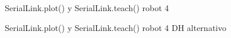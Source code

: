 \documentclass[a4paper,12pt]{article}
\begin{document}
\begin{figure}[htpb]
    \centering
    \begin{adjustbox}{max width=\columnwidth}
    \end{adjustbox}
    \caption{SerialLink.plot() y SerialLink.teach() robot 4}
    \label{teach robot 4}
\end{figure}

\begin{figure}[htpb]
    \centering
    \begin{adjustbox}{max width=\columnwidth}
    \end{adjustbox}
    \caption{SerialLink.plot() y SerialLink.teach() robot 4 DH alternativo}
    \label{teach robot 4 alt}
\end{figure}
\end{document}

